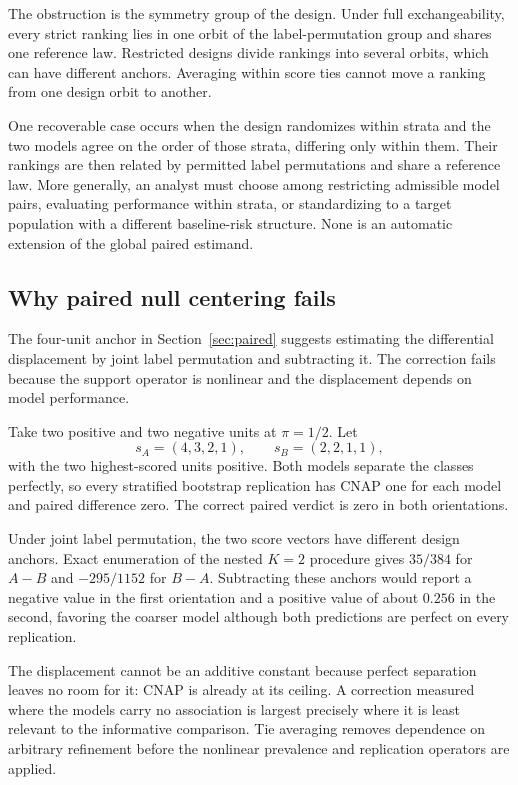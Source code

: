 \documentclass[11pt]{article}
\theoremstyle{remark}
\begin{document}
The obstruction is the symmetry group of the design. Under full exchangeability, every strict ranking lies in one orbit of the label-permutation group and shares one reference law. Restricted designs divide rankings into several orbits, which can have different anchors. Averaging within score ties cannot move a ranking from one design orbit to another.

One recoverable case occurs when the design randomizes within strata and the two models agree on the order of those strata, differing only within them. Their rankings are then related by permitted label permutations and share a reference law. More generally, an analyst must choose among restricting admissible model pairs, evaluating performance within strata, or standardizing to a target population with a different baseline-risk structure. None is an automatic extension of the global paired estimand.

\subsection{Why paired null centering fails}

The four-unit anchor in Section~\ref{sec:paired} suggests estimating the differential displacement by joint label permutation and subtracting it. The correction fails because the support operator is nonlinear and the displacement depends on model performance.

Take two positive and two negative units at $\pi=1/2$. Let
\[
s_A=(4,3,2,1),
\qquad
s_B=(2,2,1,1),
\]
with the two highest-scored units positive. Both models separate the classes perfectly, so every stratified bootstrap replication has CNAP one for each model and paired difference zero. The correct paired verdict is zero in both orientations.

Under joint label permutation, the two score vectors have different design anchors. Exact enumeration of the nested $K=2$ procedure gives $35/384$ for $A-B$ and $-295/1152$ for $B-A$. Subtracting these anchors would report a negative value in the first orientation and a positive value of about $0.256$ in the second, favoring the coarser model although both predictions are perfect on every replication.

The displacement cannot be an additive constant because perfect separation leaves no room for it: CNAP is already at its ceiling. A correction measured where the models carry no association is largest precisely where it is least relevant to the informative comparison. Tie averaging removes dependence on arbitrary refinement before the nonlinear prevalence and replication operators are applied.
\end{document}
